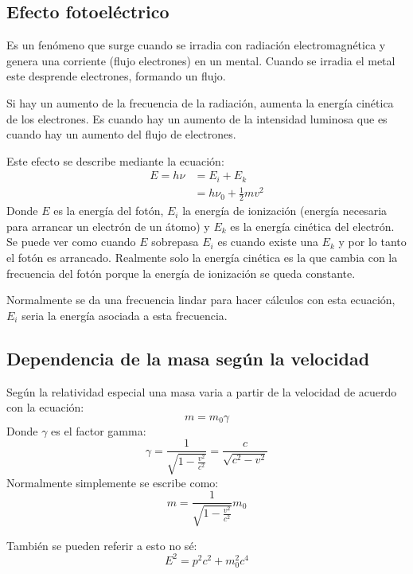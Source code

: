 \documentclass[arial,a4paper,print]{article}
\begin{document}
\subsection{Efecto fotoeléctrico}
Es un fenómeno que surge cuando se irradia con radiación electromagnética y genera una corriente (flujo electrones) en un mental. Cuando se irradia el metal este desprende electrones, formando un flujo. 

Si hay un aumento de la frecuencia de la radiación, aumenta la energía cinética de los electrones. Es cuando hay un aumento de la intensidad luminosa que es cuando hay un aumento del flujo de electrones. 

Este efecto se describe mediante la ecuación:
\begin{align*}
	E = h\nu &= E_{i} + E_{k} \\
	&= h\nu_0 + \frac12mv^2 
\end{align*}
Donde $E$ es la energía del fotón, $E_{i}$ la energía de ionización (energía necesaria para arrancar un electrón de un átomo) y $E_{k}$ es la energía cinética del electrón. Se puede ver como cuando $E$ sobrepasa $E_{i}$ es cuando existe una $E_{k}$ y por lo tanto el fotón es arrancado. Realmente solo la energía cinética es la que cambia con la frecuencia del fotón porque la energía de ionización se queda constante. 

Normalmente se da una frecuencia lindar para hacer cálculos con esta ecuación, $E_{i}$ seria la energía asociada a esta frecuencia. 

\subsection{Dependencia de la masa según la velocidad}
Según la relatividad especial una masa varia a partir de la velocidad de acuerdo con la ecuación:
\begin{equation*}
	m=m_{0}\gamma
\end{equation*}
Donde $\gamma$ es el factor gamma:
\begin{equation*}
	\gamma = \frac{1}{\sqrt{1-\frac{v^2}{c^{2}}}} = \frac{c}{\sqrt{c^{2} - v^2}}
\end{equation*}
Normalmente simplemente se escribe como:
\begin{equation*}
	m=\frac{1}{\sqrt{1-\frac{v^2}{c^{2}}}}m_{0}
\end{equation*}

También se pueden referir a esto no sé:
\begin{equation*}
	E^{2} = p^{2}c^{2} + m_{0}^{2}c^{4}
\end{equation*}
\end{document}
